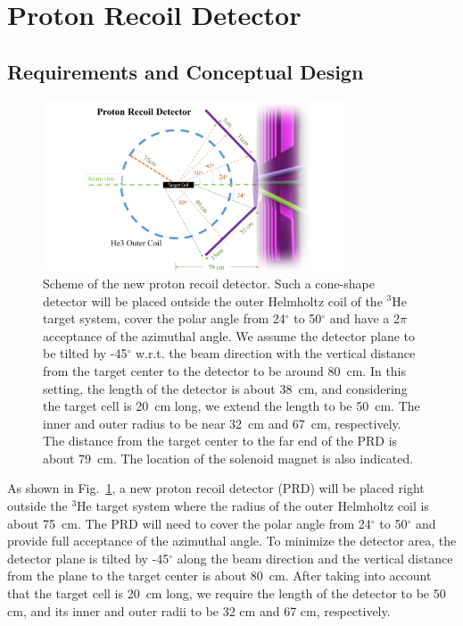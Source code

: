 \section{Proton Recoil Detector}
\subsection{Requirements and Conceptual Design}
\begin{figure}[!ht]
 \begin{center}
  \includegraphics[width=0.8\textwidth]{./figures/prd_solid.pdf}
   \caption[Scheme of the new proton recoil detector ]{\footnotesize{Scheme of the new proton recoil detector. Such a cone-shape detector will be placed outside the outer Helmholtz coil of the $\mathrm{^{3}He}$ target system, cover the polar angle from 24$^{\circ}$ to  50$^{\circ}$ and have a 2$\pi$ acceptance of the azimuthal angle. We assume the detector plane to be tilted by -45$^{\circ}$ w.r.t. the beam direction with the vertical distance from the target center to the detector to be around 80~cm. In this setting, the length of the detector is about 38~cm, and considering the target cell is 20~cm long, we extend the length to be 50~cm. The inner and outer radius to be near 32~cm and 67~cm, respectively. The distance from the target center to the far end of the PRD is about 79~cm. The location of the solenoid magnet is also indicated.}}
   \label{prd_concept}
 \end{center}
\end{figure}
As shown in Fig.~\ref{prd_concept}, a new proton recoil detector (PRD) will be placed right outside the $\mathrm{^{3}He}$ target system where the radius of the outer Helmholtz coil is about 75~cm. The PRD will need to cover the polar angle from 24$^{\circ}$ to  50$^{\circ}$ and provide full acceptance of the azimuthal angle. To minimize the detector area, the detector plane is tilted by -45$^{\circ}$ along the beam direction and the vertical distance from the plane to the target center is about 80~cm. After taking into account that the target cell is 20~cm long, we require the length of the detector to be 50 cm, and its inner and outer radii to be 32 cm and 67 cm, respectively.

